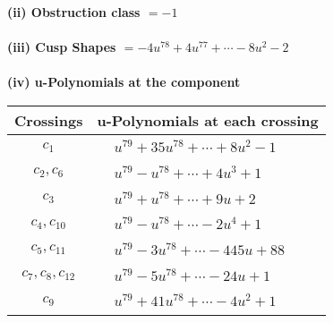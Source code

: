 \documentclass[1p]{elsarticle_modified}
\theoremstyle{definition}
\begin{document}
\flushleft \textbf{(ii) Obstruction class $= -1$}\\~\\
\flushleft \textbf{(iii) Cusp Shapes $= -4 u^{78}+4 u^{77}+\cdots-8 u^2-2$}\\~\\
\newpage\renewcommand{\arraystretch}{1}
\flushleft \textbf{(iv) u-Polynomials at the component}\newline \\
\begin{tabular}{m{50pt}|m{274pt}}
Crossings & \hspace{64pt}u-Polynomials at each crossing \\
\hline $$\begin{aligned}c_{1}\end{aligned}$$&$\begin{aligned}
&u^{79}+35 u^{78}+\cdots+8 u^2-1
\end{aligned}$\\
\hline $$\begin{aligned}c_{2},c_{6}\end{aligned}$$&$\begin{aligned}
&u^{79}- u^{78}+\cdots+4 u^3+1
\end{aligned}$\\
\hline $$\begin{aligned}c_{3}\end{aligned}$$&$\begin{aligned}
&u^{79}+u^{78}+\cdots+9 u+2
\end{aligned}$\\
\hline $$\begin{aligned}c_{4},c_{10}\end{aligned}$$&$\begin{aligned}
&u^{79}- u^{78}+\cdots-2 u^4+1
\end{aligned}$\\
\hline $$\begin{aligned}c_{5},c_{11}\end{aligned}$$&$\begin{aligned}
&u^{79}-3 u^{78}+\cdots-445 u+88
\end{aligned}$\\
\hline $$\begin{aligned}c_{7},c_{8},c_{12}\end{aligned}$$&$\begin{aligned}
&u^{79}-5 u^{78}+\cdots-24 u+1
\end{aligned}$\\
\hline $$\begin{aligned}c_{9}\end{aligned}$$&$\begin{aligned}
&u^{79}+41 u^{78}+\cdots-4 u^2+1
\end{aligned}$\\
\hline
\end{tabular}\\~\\
\end{document}
